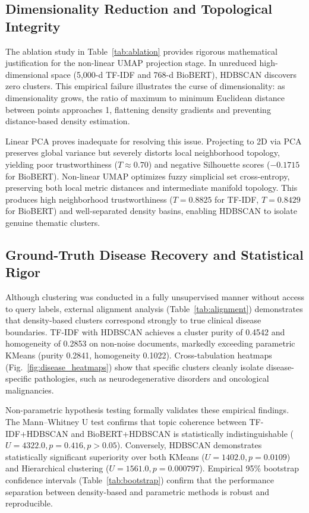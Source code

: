 \documentclass[a4paper,10pt,conference]{IEEEtran}
\begin{document}
\subsection{Dimensionality Reduction and Topological Integrity}

The ablation study in Table~\ref{tab:ablation} provides rigorous mathematical justification for the non-linear UMAP projection stage. In unreduced high-dimensional space (5,000-d TF-IDF and 768-d BioBERT), HDBSCAN discovers zero clusters. This empirical failure illustrates the curse of dimensionality: as dimensionality grows, the ratio of maximum to minimum Euclidean distance between points approaches 1, flattening density gradients and preventing distance-based density estimation.

Linear PCA proves inadequate for resolving this issue. Projecting to 2D via PCA preserves global variance but severely distorts local neighborhood topology, yielding poor trustworthiness ($T \approx 0.70$) and negative Silhouette scores ($-0.1715$ for BioBERT). Non-linear UMAP optimizes fuzzy simplicial set cross-entropy, preserving both local metric distances and intermediate manifold topology. This produces high neighborhood trustworthiness ($T=0.8825$ for TF-IDF, $T=0.8429$ for BioBERT) and well-separated density basins, enabling HDBSCAN to isolate genuine thematic clusters.

\subsection{Ground-Truth Disease Recovery and Statistical Rigor}

Although clustering was conducted in a fully unsupervised manner without access to query labels, external alignment analysis (Table~\ref{tab:alignment}) demonstrates that density-based clusters correspond strongly to true clinical disease boundaries. TF-IDF with HDBSCAN achieves a cluster purity of 0.4542 and homogeneity of 0.2853 on non-noise documents, markedly exceeding parametric KMeans (purity 0.2841, homogeneity 0.1022). Cross-tabulation heatmaps (Fig.~\ref{fig:disease_heatmaps}) show that specific clusters cleanly isolate disease-specific pathologies, such as neurodegenerative disorders and oncological malignancies.

Non-parametric hypothesis testing formally validates these empirical findings. The Mann--Whitney U test confirms that topic coherence between TF-IDF+HDBSCAN and BioBERT+HDBSCAN is statistically indistinguishable ($U = 4322.0, p = 0.416, p > 0.05$). Conversely, HDBSCAN demonstrates statistically significant superiority over both KMeans ($U = 1402.0, p = 0.0109$) and Hierarchical clustering ($U = 1561.0, p = 0.000797$). Empirical 95\% bootstrap confidence intervals (Table~\ref{tab:bootstrap}) confirm that the performance separation between density-based and parametric methods is robust and reproducible.
\end{document}
